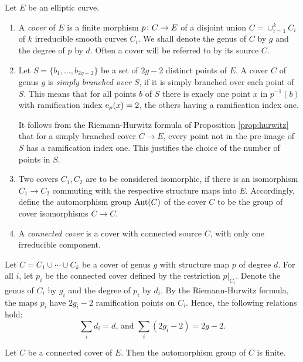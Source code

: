 \begin{defi} Let $E$ be an elliptic curve.
 \begin{enumerate}
  \item A \emph{cover} of $E$ is a finite morphism $p\colon C\to E$ of a disjoint union $C=\cup_{i=1}^k C_i$ of $k$ irreducible smooth curves $C_i$. We shall denote the genus of $C$ by $g$ and the degree of $p$ by $d$. Often a cover will be referred to by its source $C$.
  
  \item Let $S=\{b_1,\dotsc,b_{2g-2}\}$ be a set of $2g-2$ distinct points of $E$. A cover $C$ of genus $g$ is \emph{simply branched over $S$}, if it is simply branched over each point of $S$. This means that for all points $b$ of $S$ there is exacly one point $x$ in $p^{-1}(b)$ with ramification index $\operatorname{e}_p(x)=2$, the others having a ramification index one.
  
  It follows from the Riemann-Hurwitz formula of Proposition \ref{prop:hurwitz} that for a simply branched cover $C\to E$, every point not in the pre-image of $S$ has a ramification index one. This justifies the choice of the number of points in $S$.
  
  \item Two covers $C_1, C_2$ are to be considered isomorphic, if there is an isomorphism $C_1\to C_2$ commuting with the respective structure maps into $E$. Accordingly, define the automorphism group $\operatorname{Aut}(C)$ of the cover $C$ to be the group of cover isomorphisms $C\to C$.
  
  \item A \emph{connected cover} is a cover with connected source $C$, \ie with only one irreducible component.
 \end{enumerate}
\end{defi}

\begin{rmk}
 Let $C=C_1 \cup \dotsb \cup C_k$ be a cover of genus $g$ with structure map $p$ of degree $d$. For all $i$, let $p_i$ be the connected cover defined by the restriction $p|_{C_i}$. Denote the genus of $C_i$ by $g_i$  and the degree of $p_i$ by $d_i$. By the Riemann-Hurwitz formula, the maps $p_i$ have $2g_i-2$ ramification points on $C_i$. Hence, the following relations hold:
 \[\sum_i d_i=d\text{, and }\sum_i (2g_i-2)=2g-2.\]
\end{rmk}

\begin{prop}
 Let $C$ be a connected cover of $E$. Then the automorphism group of $C$ is finite.
\end{prop}


